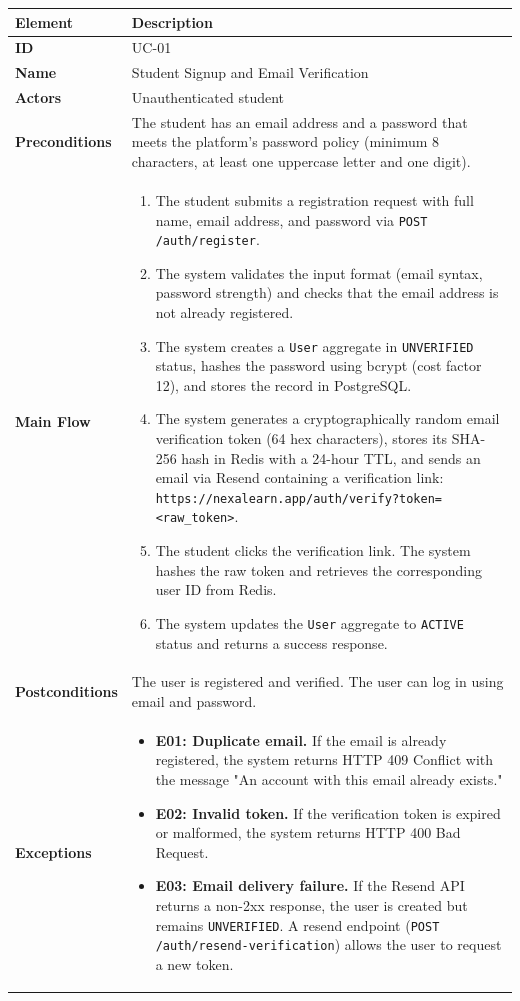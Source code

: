 \begin{longtable}{p{3cm}p{10cm}}
  \toprule
  \textbf{Element} & \textbf{Description} \\
  \midrule
  \endhead
  \midrule
  \endfoot
  \textbf{ID} & UC-01 \\
  \textbf{Name} & Student Signup and Email Verification \\
  \textbf{Actors} & Unauthenticated student \\
  \textbf{Preconditions} & The student has an email address and a password that meets the platform's password policy (minimum 8 characters, at least one uppercase letter and one digit). \\
  \textbf{Main Flow} &
  \begin{enumerate}
    \item The student submits a registration request with full name, email address, and password via \texttt{POST /auth/register}.
    \item The system validates the input format (email syntax, password strength) and checks that the email address is not already registered.
    \item The system creates a \texttt{User} aggregate in \texttt{UNVERIFIED} status, hashes the password using bcrypt (cost factor 12), and stores the record in PostgreSQL.
    \item The system generates a cryptographically random email verification token (64 hex characters), stores its SHA-256 hash in Redis with a 24-hour TTL, and sends an email via Resend containing a verification link: \texttt{https://nexalearn.app/auth/verify?token=<raw\_token>}.
    \item The student clicks the verification link. The system hashes the raw token and retrieves the corresponding user ID from Redis.
    \item The system updates the \texttt{User} aggregate to \texttt{ACTIVE} status and returns a success response.
  \end{enumerate} \\
  \textbf{Postconditions} & The user is registered and verified. The user can log in using email and password. \\
  \textbf{Exceptions} &
  \begin{itemize}
    \item \textbf{E01: Duplicate email.} If the email is already registered, the system returns HTTP 409 Conflict with the message "An account with this email already exists."
    \item \textbf{E02: Invalid token.} If the verification token is expired or malformed, the system returns HTTP 400 Bad Request.
    \item \textbf{E03: Email delivery failure.} If the Resend API returns a non-2xx response, the user is created but remains \texttt{UNVERIFIED}. A resend endpoint (\texttt{POST /auth/resend-verification}) allows the user to request a new token.
  \end{itemize} \\
  \bottomrule
\end{longtable}

